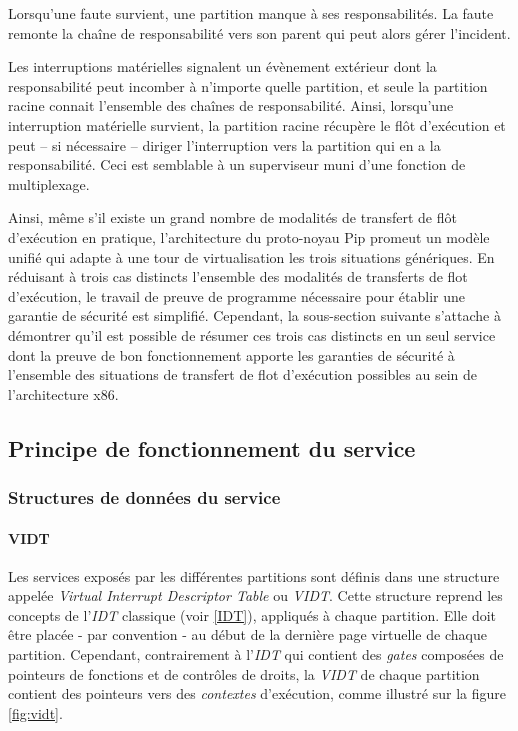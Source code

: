 	Lorsqu'une faute survient, une partition manque à ses responsabilités. La faute remonte la chaîne de responsabilité vers son parent qui peut alors gérer l'incident.

	Les interruptions matérielles signalent un évènement extérieur dont la responsabilité peut incomber à n'importe quelle partition, et seule la partition racine connait l'ensemble des chaînes de responsabilité. Ainsi, lorsqu'une interruption matérielle survient, la partition racine récupère le flôt d'exécution et peut -- si nécessaire -- diriger l'interruption vers la partition qui en a la responsabilité. Ceci est semblable à un superviseur muni d'une fonction de multiplexage.

Ainsi, même s'il existe un grand nombre de modalités de transfert de flôt d'exécution en pratique, l'architecture du proto-noyau Pip promeut un modèle unifié qui adapte à une tour de virtualisation les trois situations génériques. En réduisant à trois cas distincts l'ensemble des modalités de transferts de flot d'exécution, le travail de preuve de programme nécessaire pour établir une garantie de sécurité est simplifié. Cependant, la sous-section suivante s'attache à démontrer qu'il est possible de résumer ces trois cas distincts en un seul service dont la preuve de bon fonctionnement apporte les garanties de sécurité à l'ensemble des situations de transfert de flot d'exécution possibles au sein de l'architecture x86.

	\subsection{Principe de fonctionnement du service} 
	\label{service_idea}

	\subsubsection{Structures de données du service}

	\paragraph{VIDT} Les services exposés par les différentes partitions sont définis dans une structure appelée \emph{Virtual Interrupt Descriptor Table} ou \emph{VIDT}. Cette structure reprend les concepts de l'\emph{IDT} classique (voir \ref{IDT}), appliqués à chaque partition. Elle doit être placée - par convention - au début de la dernière page virtuelle de chaque partition. Cependant, contrairement à l'\emph{IDT} qui contient des \emph{gates} composées de pointeurs de fonctions et de contrôles de droits, la \emph{VIDT} de chaque partition contient des pointeurs vers des \emph{contextes} d'exécution, comme illustré sur la figure \ref{fig:vidt}.


